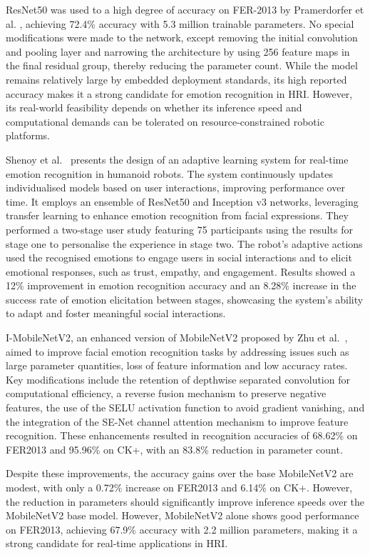 ResNet50 was used to a high degree of accuracy on FER-2013 by Pramerdorfer et al. \cite{Pramerdorfer2016-xx}, achieving 72.4\% accuracy with 5.3 million trainable parameters. No special modifications were made to the network, except removing the initial convolution and pooling layer and narrowing the architecture by using 256 feature maps in the final residual group, thereby reducing the parameter count. While the model remains relatively large by embedded deployment standards, its high reported accuracy makes it a strong candidate for emotion recognition in HRI. However, its real-world feasibility depends on whether its inference speed and computational demands can be tolerated on resource-constrained robotic platforms.

Shenoy et al.\ \cite{9900581} presents the design of an adaptive learning system for real-time emotion recognition in humanoid robots. The system continuously updates individualised models based on user interactions, improving performance over time. It employs an ensemble of ResNet50 and Inception v3 networks, leveraging transfer learning to enhance emotion recognition from facial expressions. They performed a two-stage user study featuring 75 participants using the results for stage one to personalise the experience in stage two. The robot's adaptive actions used the recognised emotions to engage users in social interactions and to elicit emotional responses, such as trust, empathy, and engagement. Results showed a 12\% improvement in emotion recognition accuracy and an 8.28\% increase in the success rate of emotion elicitation between stages, showcasing the system's ability to adapt and foster meaningful social interactions.

I-MobileNetV2, an enhanced version of MobileNetV2 proposed by Zhu et al.\ \cite{Zhu2024-gy}, aimed to improve facial emotion recognition tasks by addressing issues such as large parameter quantities, loss of feature information and low accuracy rates. Key modifications include the retention of depthwise separated convolution for computational efficiency, a reverse fusion mechanism to preserve negative features, the use of the SELU activation function to avoid gradient vanishing, and the integration of the SE-Net channel attention mechanism to improve feature recognition. These enhancements resulted in recognition accuracies of 68.62\% on FER2013 and 95.96\% on CK+, with an 83.8\% reduction in parameter count.

Despite these improvements, the accuracy gains over the base MobileNetV2 are modest, with only a 0.72\% increase on FER2013 and 6.14\% on CK+. However, the reduction in parameters should significantly improve inference speeds over the MobileNetV2 base model. However, MobileNetV2 alone shows good performance on FER2013, achieving 67.9\% accuracy with 2.2 million parameters, making it a strong candidate for real-time applications in HRI.

